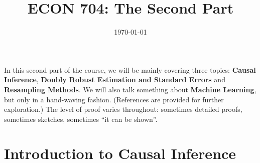 \documentclass[11pt,a4paper]{amsart}
\theoremstyle{plain}
\theoremstyle{definition}
\begin{document}
\title{ECON 704: The Second Part}
\date{\today}
\maketitle
		In this second part of the course, we will be mainly covering three topics: \textbf{Causal Inference},  \textbf{Doubly Robust Estimation and Standard Errors} and \textbf{Resampling Methods}. We will also talk something about \textbf{Machine Learning}, but only in a hand-waving fashion. (References are provided for further exploration.)  The level of proof varies throughout: sometimes detailed proofs, sometimes sketches, sometimes “it can be shown”.
	\vspace{50pt}
\tableofcontents \newpage

\section{Introduction to Causal Inference}
\end{document}
